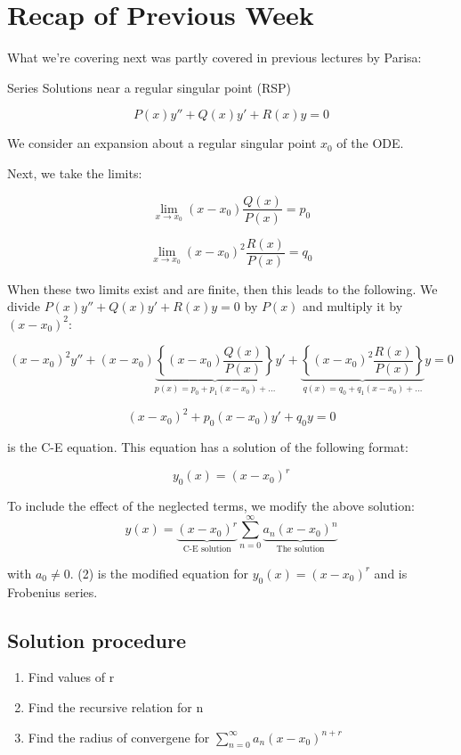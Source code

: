 \section{Recap of Previous Week}

What we're covering next was partly covered in previous lectures by Parisa:

\hfill

Series Solutions near a regular singular point (RSP)

$$ P(x) y'' + Q(x) y' + R(x)y = 0$$

We consider an expansion about a regular singular point $x_0$ of the ODE. 

Next, we take the limits:

$$\lim_{x \to x_0} (x - x_0) \frac{Q(x)}{P(x)} = p_0$$

$$\lim_{x \to x_0} (x - x_0)^2 \frac{R(x)}{P(x)} = q_0$$

When these two limits exist and are finite, then this leads to the following. We divide $ P(x) y'' + Q(x) y' + R(x)y = 0$ by $P(x)$ and multiply it by $(x - x_0)^2$:

$$(x-x_0)^2 y'' + (x - x_0) \underbrace{\left\{(x - x_0) \frac{Q(x)}{P(x)} \right\}}_{p(x) = p_0 + p_1 (x - x_0) + ...} y' + \underbrace{\left\{ (x - x_0)^2 \frac{R(x)}{P(x)} \right\}}_{q(x) = q_0 + q_1 (x - x_0) + ...} y = 0$$


$$(x - x_0)^2 + p_0 (x - x_0) y' + q_0 y = 0$$

is the C-E equation. This equation has a solution of the following format:

$$y_0(x) = (x - x_0)^r$$

To include the effect of the neglected terms, we modify the above solution:
$$y(x) = \underbrace{(x - x_0)^r}_{\text{C-E solution}} \sum_{n = 0}^{\infty} \underbrace{a_n (x - x_0)^n}_{\text{The solution}}$$


with $a_0 \neq 0$. (2) is the modified equation for $y_0(x) = (x - x_0)^r$ and is  Frobenius series. 

\subsection{Solution procedure}

\begin{enumerate}
    \item Find values of r
    \item Find the recursive relation for n
    \item Find the radius of convergene for $\sum_{n = 0}^{\infty} a_n (x - x_0)^{n +r}$
\end{enumerate}

